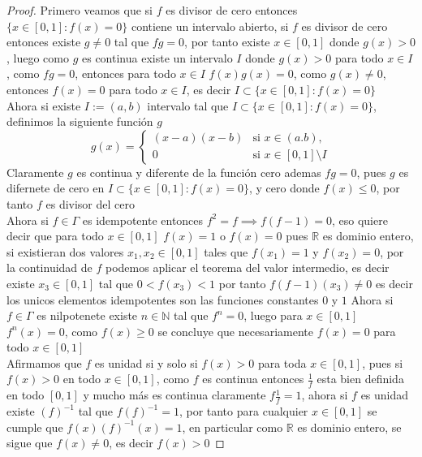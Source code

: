 \documentclass[11pt,letterpaper]{article}
\newcommand{\R}{\mathbb{R}}
\newcommand{\N}{\mathbb{N}}
\begin{document}
\begin{proof}
    Primero veamos que si $f$ es divisor de cero entonces $\{x\in [0,1]:f(x)=0\}$ contiene un intervalo abierto,
    si $f$ es divisor de cero entonces existe $g\neq 0$ tal que $fg=0$, por tanto existe $x\in [0,1]$ donde $g(x)>0$, luego 
    como $g$ es continua existe un intervalo $I$ donde $g(x)>0$ para todo $x\in I$, como $fg=0$, entonces para todo $x\in I$ $f(x)g(x)=0$, como $g(x)\neq 0$, entonces $f(x)=0$ para todo $x\in I$, es decir
    $I\subset\{x\in [0,1]:f(x)=0\}$\,\\
    Ahora si existe $I:=(a,b)$ intervalo tal que $I\subset\{x\in [0,1]:f(x)=0\}$, definimos
    la siguiente funci\'on $g$
    \[
g(x) =
\begin{cases}
(x-a)(x-b) & \text{si } x \in (a.b), \\
0  & \text{si } x \in [0,1]\setminus I
\end{cases}
\]
Claramente $g$ es continua y diferente de la funci\'on cero ademas $fg=0$, pues $g$ es difernete de cero en $I\subset\{x\in [0,1]:f(x)=0\}$, y cero donde $f(x)\leq 0$, por tanto $f$ es divisor del cero\,\\
Ahora si $f\in \Gamma$ es idempotente entonces $f^2=f\implies f(f-1)=0$, eso quiere decir que para todo $x\in [0,1]$ $f(x)=1$ o $f(x)=0$ pues $\R$ es dominio entero, si existieran dos valores $x_1,x_2\in [0,1]$ tales que $f(x_1)=1$ y $f(x_2)=0$, por la continuidad de $f$ podemos aplicar
el teorema del valor intermedio, es decir existe $x_3\in[0,1]$ tal que $0<f(x_3)<1$ por tanto $f(f-1)(x_3)\neq 0$ es decir los unicos elementos idempotentes son las funciones constantes $0$ y $1$
Ahora si $f\in \Gamma$ es nilpotenete existe $n\in \N$ tal que $f^n=0$, luego para $x\in [0,1]$ $f^n(x)=0$, como $f(x)\geq 0$ se concluye que necesariamente $f(x)=0$ para todo $x\in [0,1]$\,\\
Afirmamos que $f$ es unidad si y solo si $f(x)>0$ para toda $x\in[0,1]$, pues si $f(x)>0$ en todo $x\in[0,1]$, como $f$ es continua entonces $\frac{1}{f}$ esta bien definida en todo $[0,1]$ y mucho m\'as es continua
claramente $f\frac{1}{f}=1$, ahora si $f$ es unidad existe $(f)^{-1}$ tal que $f(f)^{-1}=1$, por tanto para cualquier $x\in[0,1]$ se cumple que
$f(x)(f)^{-1}(x)=1$, en particular como $\R$ es dominio entero, se sigue que $f(x)\neq 0$, es decir $f(x)>0$ 
\end{proof}\,\\
\end{document}
